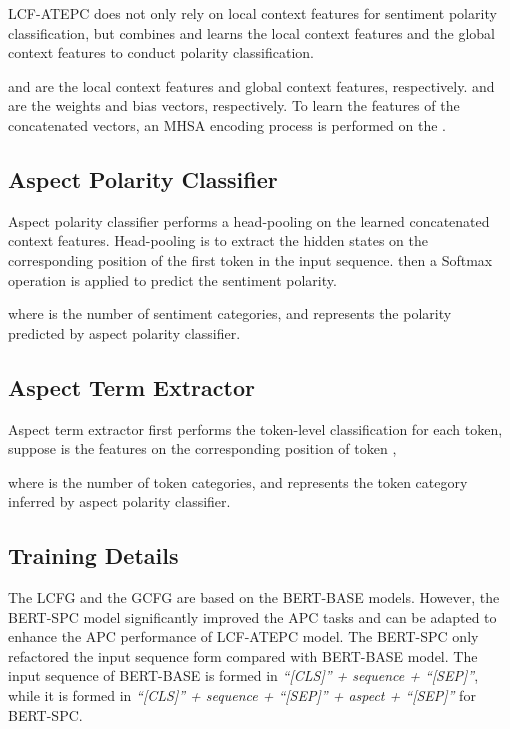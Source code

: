 \documentclass[a4paper,fleqn]{cas-sc}
\begin{document}
LCF-ATEPC does not only rely on local context features for sentiment polarity classification, but combines and learns the local context features and the global context features to conduct polarity classification.





 and  are the local context features and global context features, respectively.  and  are the weights and bias vectors, respectively. To learn the features of the concatenated vectors, an MHSA encoding process is performed on the . 

\subsection{Aspect Polarity Classifier}
Aspect polarity classifier performs a head-pooling on the learned concatenated context features. Head-pooling is to extract the hidden states on the corresponding position of the first token in the input sequence. then a Softmax operation is applied to predict the sentiment polarity.


where  is the number of sentiment categories, and  represents the polarity predicted by aspect polarity classifier.

\subsection{Aspect Term Extractor}
Aspect term extractor first performs the token-level classification for each token, suppose  is the features on the corresponding position of token ,

where  is the number of token categories, and  represents the token category inferred by aspect polarity classifier.

\subsection{Training Details}

The LCFG and the GCFG are based on the BERT-BASE models. However, the BERT-SPC \cite{song2019attentional} model significantly improved the APC tasks and can be adapted to enhance the APC performance of LCF-ATEPC model. The BERT-SPC only refactored the input sequence form compared with BERT-BASE model. The input sequence of BERT-BASE is formed in \textit{``[CLS]'' + sequence + ``[SEP]''}, while it is formed in \textit{``[CLS]'' + sequence + ``[SEP]'' + aspect + ``[SEP]''} for BERT-SPC.
\end{document}
